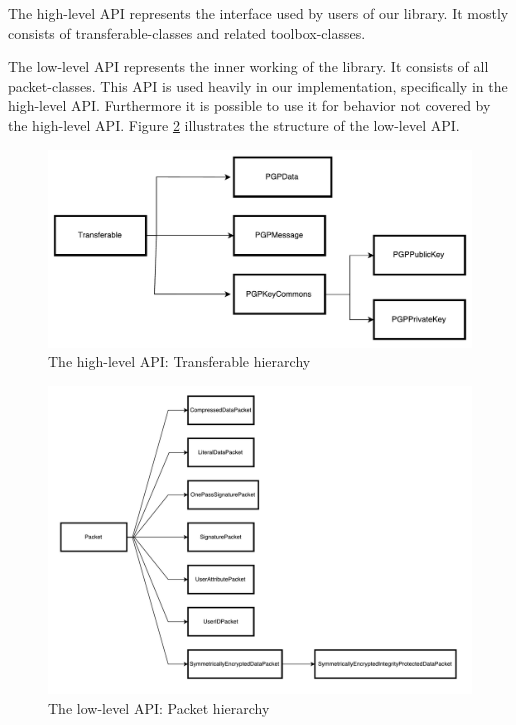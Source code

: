 The high-level API represents the interface used by users of our library. It mostly consists of transferable-classes and related toolbox-classes.

The low-level API represents the inner working of the library. It consists of all packet-classes. This API is used heavily in our implementation, specifically in the high-level API. Furthermore it is possible to use it for behavior not covered by the high-level API. Figure \ref{fig:packethierarchy} illustrates the structure of the low-level API.

\begin{figure}[p]
	\centering
	\includegraphics[width=1\linewidth]{figures/TransferableHierarchy.pdf}
	\caption[]{The high-level API: Transferable hierarchy }
	\label{fig:transferablehierarchy}
\end{figure}

\begin{figure}[p]
	\centering
	\includegraphics[width=1\linewidth]{figures/PacketHierarchy.pdf}
	\caption[]{The low-level API: Packet hierarchy }
	\label{fig:packethierarchy}
\end{figure}

